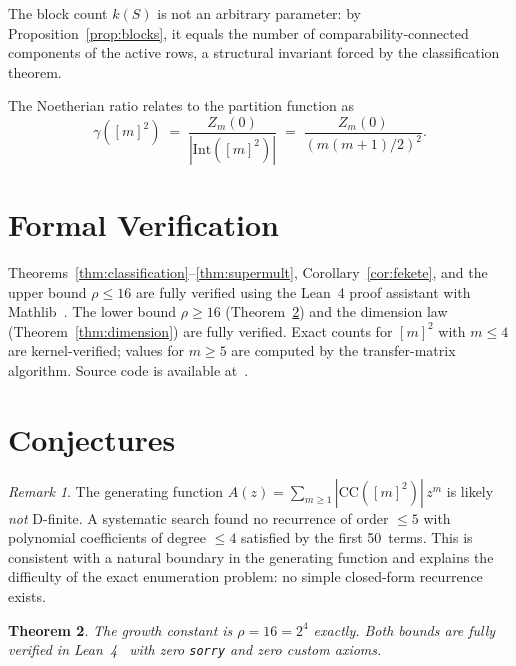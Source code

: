 \documentclass[11pt,a4paper]{article}
\theoremstyle{plain}
\newtheorem{theorem}{Theorem}[section]
\theoremstyle{definition}
\theoremstyle{remark}
\newtheorem{remark}[theorem]{Remark}
\newcommand{\CC}{\mathrm{CC}}
\begin{document}
The block count $k(S)$ is not an arbitrary parameter: by Proposition~\ref{prop:blocks}, it equals the number of comparability-connected components of the active rows, a structural invariant forced by the classification theorem.

The Noetherian ratio relates to the partition function as
\[
\gamma([m]^2) \;=\; \frac{Z_m(0)}{|\mathrm{Int}([m]^2)|} \;=\; \frac{Z_m(0)}{(m(m+1)/2)^2}.
\]


\section{Formal Verification}\label{sec:lean}

Theorems~\ref{thm:classification}--\ref{thm:supermult}, Corollary~\ref{cor:fekete}, and the upper bound $\rho \leq 16$ are fully verified using the Lean~4 proof assistant with Mathlib~\cite{mathlib}.
The lower bound $\rho \geq 16$ (Theorem~\ref{thm:rho}) and the dimension law (Theorem~\ref{thm:dimension}) are fully verified.
Exact counts for $[m]^2$ with $m \leq 4$ are kernel-verified; values for $m \geq 5$ are computed by the transfer-matrix algorithm.
Source code is available at~\cite{leanrepo}.


\section{Conjectures}\label{sec:conjectures}

\begin{remark}\label{rem:gf}
The generating function $A(z) = \sum_{m \geq 1} |\CC([m]^2)|\, z^m$ is
likely \emph{not} D-finite.
A systematic search found no recurrence of order $\leq 5$ with
polynomial coefficients of degree $\leq 4$ satisfied by the first
50~terms. This is consistent with a natural boundary in the
generating function and explains the difficulty of the exact
enumeration problem: no simple closed-form recurrence exists.
\end{remark}

\begin{theorem}\label{thm:rho}
The growth constant is $\rho = 16 = 2^4$ exactly.
Both bounds are fully verified in Lean~4~\cite{leanrepo} with zero \texttt{sorry} and zero custom axioms.
\end{theorem}
\end{document}
